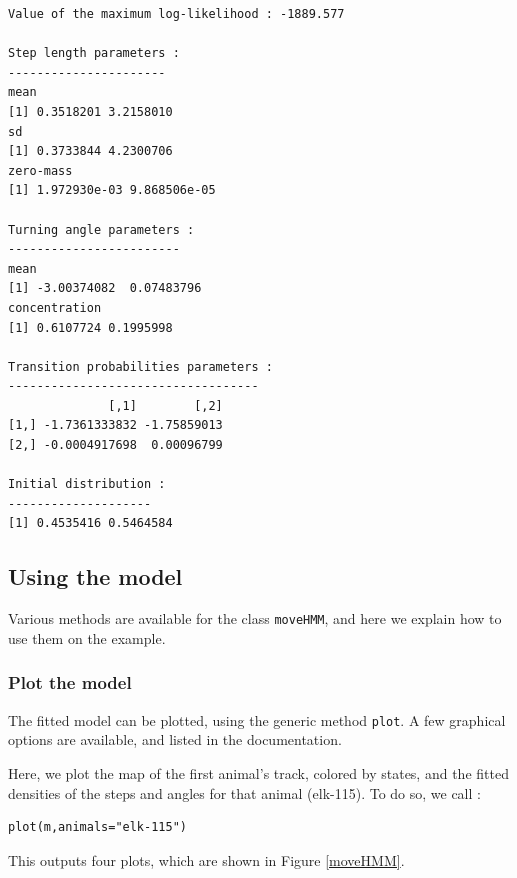 \documentclass[]{article}
\begin{document}
\begin{lstlisting}
Value of the maximum log-likelihood : -1889.577 

Step length parameters :
----------------------
mean 
[1] 0.3518201 3.2158010
sd 
[1] 0.3733844 4.2300706
zero-mass 
[1] 1.972930e-03 9.868506e-05

Turning angle parameters :
------------------------
mean 
[1] -3.00374082  0.07483796
concentration 
[1] 0.6107724 0.1995998

Transition probabilities parameters :
-----------------------------------
              [,1]        [,2]
[1,] -1.7361333832 -1.75859013
[2,] -0.0004917698  0.00096799

Initial distribution :
--------------------
[1] 0.4535416 0.5464584
\end{lstlisting}

\subsection{Using the model}
Various methods are available for the class \texttt{moveHMM}, and here we explain how to use them on the example.

\subsubsection{Plot the model}
The fitted model can be plotted, using the generic method \texttt{plot}. A few graphical options are available, and listed in the documentation.

Here, we plot the map of the first animal's track, colored by states, and the fitted densities of the steps and angles for that animal (elk-115). To do so, we call :

\begin{lstlisting}
plot(m,animals="elk-115")
\end{lstlisting}

This outputs four plots, which are shown in Figure \ref{moveHMM}.\\
\end{document}
